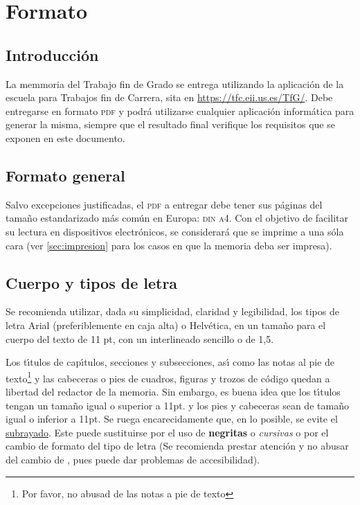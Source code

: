 
\chapter{Formato}\label{cap1}
\section{Introducci\'on}\label{sec:intro}

La memmoria del Trabajo fin de Grado se entrega utilizando la aplicaci\'on de la escuela para 
Trabajos fin de Carrera, sita en 
\url{https://tfc.eii.us.es/TfG/}. Debe entregarse en formato \textsc{pdf} y podr\'a utilizarse
cualquier aplicaci\'on inform\'atica para generar la misma, siempre que el resultado
final verifique los requisitos
que se exponen en este documento.


\section{Formato general}\label{sec:general}

Salvo excepciones justificadas, el \textsc{pdf} 
a entregar debe tener sus p\'aginas del tama{\~n}o
estandarizado m\'as com\'un en Europa: \textsc{din a4}. Con el objetivo de facilitar 
su lectura en dispositivos electr\'onicos, se considerará que
se imprime a una s\'ola cara (ver \ref{sec:impresion} para los casos en que la memoria deba ser impresa).


\section{Cuerpo y tipos de letra}\label{sec:letra}

Se recomienda utilizar, dada su simplicidad, claridad y legibilidad, los tipos de letra
Arial (preferiblemente en caja alta) o Helv\'etica, en un tamaño para el cuerpo del texto de 11 pt,
con un interlineado sencillo o de 1,5.

Los t{\'\i}tulos de cap{\'\i}tulos, secciones y subsecciones, as{\'\i} como las notas al pie de texto\footnote{Por favor, no abusad de las notas a pie de texto}
y las cabeceras o pies de cuadros, figuras y trozos de c\'odigo quedan a libertad del redactor de la memoria.
Sin embargo, es buena idea que los t{\'\i}tulos tengan un tamaño igual o superior a 11pt. y los pies y cabeceras
sean de tama{\~n}o igual o inferior a 11pt. Se ruega encarecidamente que, en lo posible, se evite el \underline{subrayado}.
Este puede sustituirse por el uso de \textbf{negritas} o \textit{cursivas} o por el cambio de formato del tipo de letra
(Se recomienda prestar atenci\'on y no abusar del cambio de {\color{blue}{color}}, 
pues puede dar problemas de accesibilidad).

